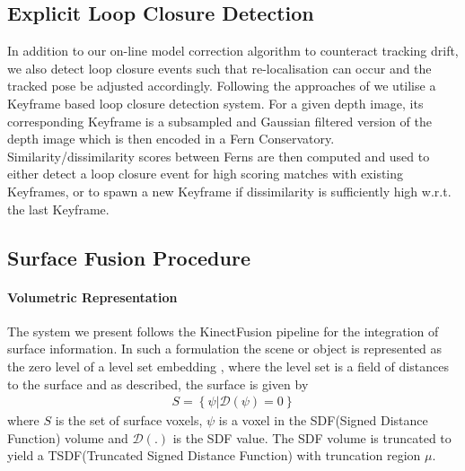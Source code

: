 \subsection{Explicit Loop Closure Detection}
In addition to our on-line model correction algorithm to counteract tracking drift, we also detect loop closure events such that re-localisation can occur and 
the tracked pose be adjusted accordingly. Following the approaches of \cite{Glocker15,Kahler2016} we utilise a Keyframe based loop closure detection system. For a 
given depth image, its corresponding Keyframe is a subsampled and Gaussian filtered version of the depth image which is then encoded in a Fern Conservatory. 
Similarity/dissimilarity scores between Ferns are then computed and used to either detect a loop closure event for high scoring matches with existing Keyframes, 
or to spawn a new Keyframe if dissimilarity is sufficiently high w.r.t. the last Keyframe.

\subsection{Surface Fusion Procedure}
\paragraph{Volumetric Representation}
The system we present follows the KinectFusion \cite{Newcombe2011} pipeline for the integration of surface information. In such a 
formulation the scene or object is represented as the zero level of a level set embedding \cite{Curless1996}, where the level set is a field of distances 
to the surface and as described, the surface is given by
\begin{equation}
	\begin{split}
		S = \left\{\psi | \mathcal{D}(\psi) = 0\right\}
	\end{split}
\end{equation}
where $S$ is the set of surface voxels, $\psi$ is a voxel in the SDF(Signed Distance Function) volume and $\mathcal{D}(.)$ is the SDF value. 
The SDF volume is truncated to yield a TSDF(Truncated Signed Distance Function) with truncation region $\mu$.

